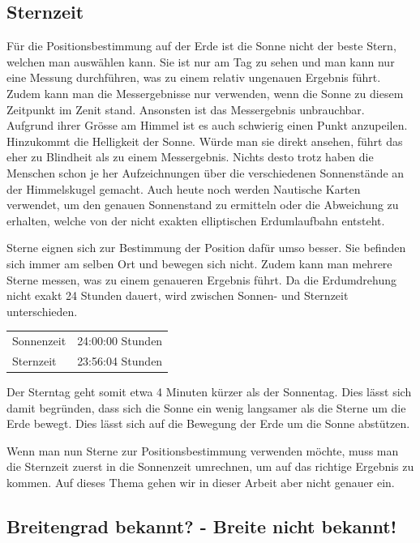 \begin{refsection}
\subsection{Sternzeit}
Für die Positionsbestimmung auf der Erde ist die Sonne nicht der beste Stern, welchen man auswählen kann. Sie ist nur am Tag zu sehen und man kann nur eine Messung durchführen, was zu einem relativ ungenauen Ergebnis führt. Zudem kann man die Messergebnisse nur verwenden, wenn die Sonne zu diesem Zeitpunkt im Zenit stand. Ansonsten ist das Messergebnis unbrauchbar. Aufgrund ihrer Grösse am Himmel ist es auch schwierig einen Punkt anzupeilen. Hinzukommt die Helligkeit der Sonne. Würde man sie direkt ansehen, führt das eher zu Blindheit als zu einem Messergebnis.
Nichts desto trotz haben die Menschen schon je her Aufzeichnungen über die verschiedenen Sonnenstände an der Himmelskugel gemacht. Auch heute noch werden Nautische Karten verwendet, um den genauen Sonnenstand zu ermitteln oder die Abweichung zu erhalten, welche von der nicht exakten elliptischen Erdumlaufbahn entsteht.

Sterne eignen sich zur Bestimmung der Position dafür umso besser. Sie befinden sich immer am selben Ort und bewegen sich nicht. Zudem kann man mehrere Sterne messen, was zu einem genaueren Ergebnis führt. Da die Erdumdrehung nicht exakt 24 Stunden dauert, wird zwischen Sonnen- und Sternzeit unterschieden.

\begin{center}
\begin{tabular}{ll}
Sonnenzeit & 24:00:00 Stunden \\
Sternzeit & 23:56:04 Stunden
\end{tabular}
\end{center}

Der Sterntag geht somit etwa 4 Minuten kürzer als der Sonnentag. Dies lässt sich damit begründen, dass sich die Sonne ein wenig langsamer als die Sterne um die Erde bewegt. Dies lässt sich auf die Bewegung der Erde um die Sonne abstützen.

Wenn man nun Sterne zur Positionsbestimmung verwenden möchte, muss man die Sternzeit zuerst in die Sonnenzeit umrechnen, um auf das richtige Ergebnis zu kommen. Auf dieses Thema gehen wir in dieser Arbeit aber nicht genauer ein.


\subsection{Breitengrad bekannt? - Breite nicht bekannt!}


\end{refsection}

